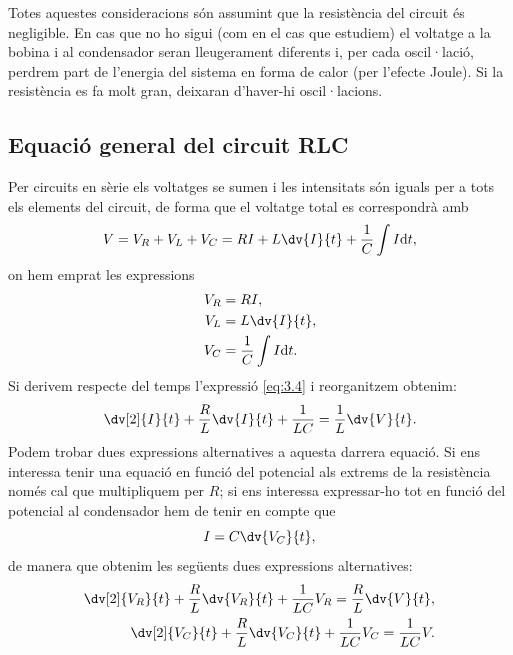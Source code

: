 \documentclass[a4paper,10.5pt]{report}
\begin{document}
Totes aquestes consideracions són assumint que la resistència del circuit és negligible. En cas que no ho sigui (com en el cas que estudiem) el voltatge a la bobina i al condensador seran lleugerament diferents i, per cada oscil·lació, perdrem part de l'energia del sistema en forma de calor (per l'efecte Joule). Si la resistència es fa molt gran, deixaran d'haver-hi oscil·lacions.

\subsection{Equació general del circuit RLC}
Per circuits en sèrie els voltatges se sumen i les intensitats són iguals per a tots els elements del circuit, de forma que el voltatge total es correspondrà amb
\begin{equation}
	V = V_R + V_L + V_C = RI + L \dv{I}{t} + \frac{1}{C} \int I\mathrm{d}t, \label{eq:3.4}
\end{equation}
on hem emprat les expressions 
\begin{align}
	V_R & = RI, \\
	V_L & = L \dv{I}{t}, \\
	V_C & = \frac{1}{C} \int I \mathrm{d}t.
\end{align}
Si derivem respecte del temps l'expressió \eqref{eq:3.4} i reorganitzem obtenim:
\begin{equation}
	\dv[2]{I}{t} + \frac{R}{L} \dv{I}{t}+\frac{1}{LC} = \frac{1}{L}\dv{V}{t}.\label{eq:3.8}
\end{equation}
Podem trobar dues expressions alternatives a aquesta darrera equació. Si ens interessa tenir una equació en funció del potencial als extrems de la resistència només cal que multipliquem per $R$; si ens interessa expressar-ho tot en funció del potencial al condensador hem de tenir en compte que
\begin{equation}
	I = C \dv{V_C}{t},
\end{equation}
de manera que obtenim les següents dues expressions alternatives:
\begin{align}
	\dv[2]{V_R}{t} + \frac{R}{L}\dv{V_R}{t} + \frac{1}{LC}V_R = \frac{R}{L} \dv{V}{t}, \\
	\dv[2]{V_C}{t} + \frac{R}{L}\dv{V_C}{t} + \frac{1}{LC}V_C=\frac{1}{LC}V. \label{eq:3.11}
\end{align}
\end{document}

